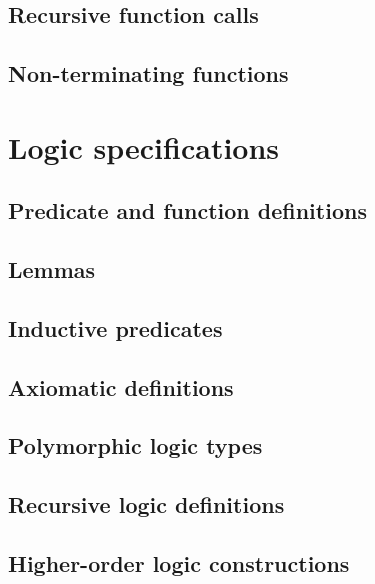 \subsection{Recursive function calls}

\subsection{Non-terminating functions}
\label{sec:non-term-funct}
\experimental

\section{Logic specifications}
\label{sec:logicspec}

\subsection{Predicate and function definitions}

\subsection{Lemmas}

\subsection{Inductive predicates}
\label{sec:inductivepredicates}


\subsection{Axiomatic definitions}

\subsection{Polymorphic logic types}\label{sec:polym-logic-types}
\experimental

\subsection{Recursive logic definitions}

\subsection{Higher-order logic constructions}
\label{sec:higherorder}


